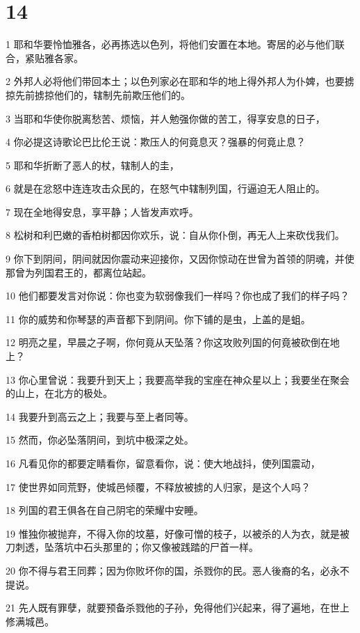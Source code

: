 \chapter{14}

\par 1 耶和华要怜恤雅各，必再拣选以色列，将他们安置在本地。寄居的必与他们联合，紧贴雅各家。
\par 2 外邦人必将他们带回本土；以色列家必在耶和华的地上得外邦人为仆婢，也要掳掠先前掳掠他们的，辖制先前欺压他们的。
\par 3 当耶和华使你脱离愁苦、烦恼，并人勉强你做的苦工，得享安息的日子，
\par 4 你必提这诗歌论巴比伦王说：欺压人的何竟息灭？强暴的何竟止息？
\par 5 耶和华折断了恶人的杖，辖制人的圭，
\par 6 就是在忿怒中连连攻击众民的，在怒气中辖制列国，行逼迫无人阻止的。
\par 7 现在全地得安息，享平静；人皆发声欢呼。
\par 8 松树和利巴嫩的香柏树都因你欢乐，说：自从你仆倒，再无人上来砍伐我们。
\par 9 你下到阴间，阴间就因你震动来迎接你，又因你惊动在世曾为首领的阴魂，并使那曾为列国君王的，都离位站起。
\par 10 他们都要发言对你说：你也变为软弱像我们一样吗？你也成了我们的样子吗？
\par 11 你的威势和你琴瑟的声音都下到阴间。你下铺的是虫，上盖的是蛆。
\par 12 明亮之星，早晨之子啊，你何竟从天坠落？你这攻败列国的何竟被砍倒在地上？
\par 13 你心里曾说：我要升到天上；我要高举我的宝座在神众星以上；我要坐在聚会的山上，在北方的极处。
\par 14 我要升到高云之上；我要与至上者同等。
\par 15 然而，你必坠落阴间，到坑中极深之处。
\par 16 凡看见你的都要定睛看你，留意看你，说：使大地战抖，使列国震动，
\par 17 使世界如同荒野，使城邑倾覆，不释放被掳的人归家，是这个人吗？
\par 18 列国的君王俱各在自己阴宅的荣耀中安睡。
\par 19 惟独你被抛弃，不得入你的坟墓，好像可憎的枝子，以被杀的人为衣，就是被刀刺透，坠落坑中石头那里的；你又像被践踏的尸首一样。
\par 20 你不得与君王同葬；因为你败坏你的国，杀戮你的民。恶人後裔的名，必永不提说。
\par 21 先人既有罪孽，就要预备杀戮他的子孙，免得他们兴起来，得了遍地，在世上修满城邑。

